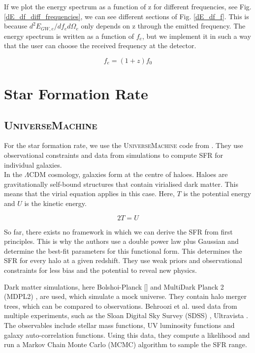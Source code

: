 If we plot the energy spectrum as a function of z for different frequencies, see Fig. \ref{dE_df_diff_frequencies}, we can see different sections of Fig. \ref{dE_df_f}. This is because $d^2 E_{GW,e}/df_e d\Omega_e$ only depends on z through the emitted frequency. The energy spectrum is written as a function of $f_e$, but we implement it in such a way that the user can choose the received frequency at the detector.


\begin{equation}
    f_e = (1+z)f_0
\end{equation}

\section{Star Formation Rate}
\subsection{\textsc{UniverseMachine}}

For the star formation rate, we use the \textsc{UniverseMachine} code from \cite{behroozi_universemachine_2019}. They use observational constraints and data from simulations to compute SFR for individual galaxies. \\

In the $\Lambda$CDM cosmology, galaxies form at the centre of haloes. Haloes are gravitationally self-bound structures that contain virialised dark matter. This means that the virial equation applies in this case. Here, $T$ is the potential energy and $U$ is the kinetic energy.

\begin{equation}
    2T=U
\end{equation}

So far, there exists no framework in which we can derive the SFR from first principles. This is why the authors use a double power law plus Gaussian and determine the best-fit parameters for this functional form. This determines the SFR for every halo at a given redshift. They use weak priors and observational constraints for less bias and the potential to reveal new physics.

Dark matter simulations, here Bolshoi-Planck [\cite{klypin_dark_2011}] and MultiDark Planck 2 (MDPL2) \cite{klypin_multidark_2016}, are used, which simulate a mock universe. They contain halo merger trees, which can be compared to observations. Behroozi et al. used data from multiple experiments, such as the Sloan Digital Sky Survey (SDSS) \cite{abazajian_seventh_2009}, Ultravista \cite{mccracken_ultravista_2012}. The observables include stellar mass functions, UV luminosity functions and galaxy auto-correlation functions.
Using this data, they compute a likelihood and run a Markov Chain Monte Carlo (MCMC) algorithm to sample the SFR range.

